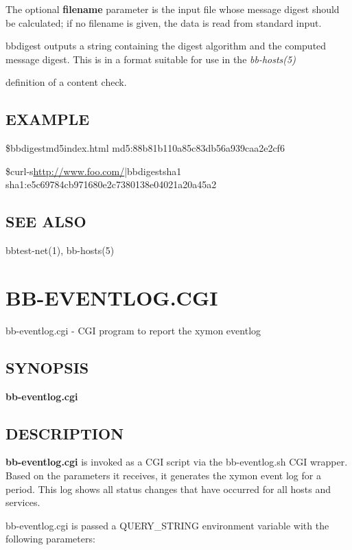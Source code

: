   The optional \textbf{filename} parameter is the input file whose
  message digest should be calculated; if no filename is given, the
  data is read from standard input. 



  bbdigest outputs a string containing the digest algorithm and the
  computed message digest. This is in a format suitable for use in the
  \emph{bb-hosts(5)}

 definition of a content check. 


 
\subsection{EXAMPLE}


\$bbdigestmd5index.html  md5:88b81b110a85c83db56a939caa2e2cf6 
  
\$curl-s\url{http://www.foo.com/}|bbdigestsha1  sha1:e5c69784cb971680e2c7380138e04021a20a45a2 

 
\subsection{SEE ALSO}
bbtest-net(1), bb-hosts(5) 

 


%
\newpage
\section{BB-EVENTLOG.CGI}

 bb-eventlog.cgi - CGI program to report the xymon eventlog \subsection{SYNOPSIS}
\textbf{bb-eventlog.cgi}


 

\subsection{DESCRIPTION}
\textbf{bb-eventlog.cgi}
 is invoked as a CGI script via the bb-eventlog.sh CGI wrapper. Based
 on the parameters it receives, it generates the xymon event log for
 a period. This log shows all status changes that have occurred for
 all hosts and services. 


  bb-eventlog.cgi is passed a QUERY\_STRING environment variable with the following parameters: 


